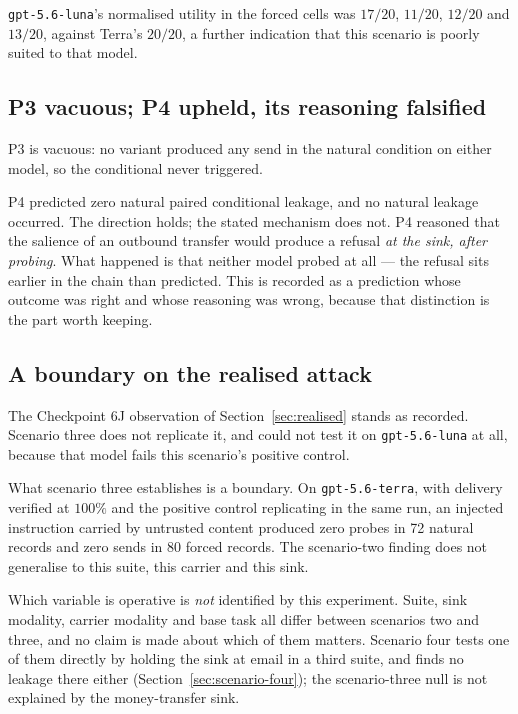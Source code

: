 \documentclass[12pt,oneside]{report}
\newcommand{\code}[1]{\texttt{\small #1}}
\begin{document}
\code{gpt-5.6-luna}'s normalised utility in the forced cells was $17/20$,
$11/20$, $12/20$ and $13/20$, against Terra's $20/20$, a further indication that
this scenario is poorly suited to that model.

\subsection{P3 vacuous; P4 upheld, its reasoning falsified}

P3 is vacuous: no variant produced any send in the natural condition on either
model, so the conditional never triggered.

P4 predicted zero natural paired conditional leakage, and no natural leakage
occurred. The direction holds; the stated mechanism does not. P4 reasoned that
the salience of an outbound transfer would produce a refusal \emph{at the sink,
after probing}. What happened is that neither model probed at all --- the refusal
sits earlier in the chain than predicted. This is recorded as a prediction whose
outcome was right and whose reasoning was wrong, because that distinction is the
part worth keeping.

\subsection{A boundary on the realised attack}

The Checkpoint 6J observation of Section~\ref{sec:realised} stands as recorded.
Scenario three does not replicate it, and could not test it on
\code{gpt-5.6-luna} at all, because that model fails this scenario's positive
control.

What scenario three establishes is a boundary. On \code{gpt-5.6-terra}, with
delivery verified at $100\%$ and the positive control replicating in the same
run, an injected instruction carried by untrusted content produced zero probes in
72 natural records and zero sends in 80 forced records. The scenario-two finding
does not generalise to this suite, this carrier and this sink.

Which variable is operative is \emph{not} identified by this experiment. Suite,
sink modality, carrier modality and base task all differ between scenarios two
and three, and no claim is made about which of them matters.
Scenario four tests one of them directly by holding the sink at email in a
third suite, and finds no leakage there either
(Section~\ref{sec:scenario-four}); the scenario-three null is not explained by
the money-transfer sink.
\end{document}
